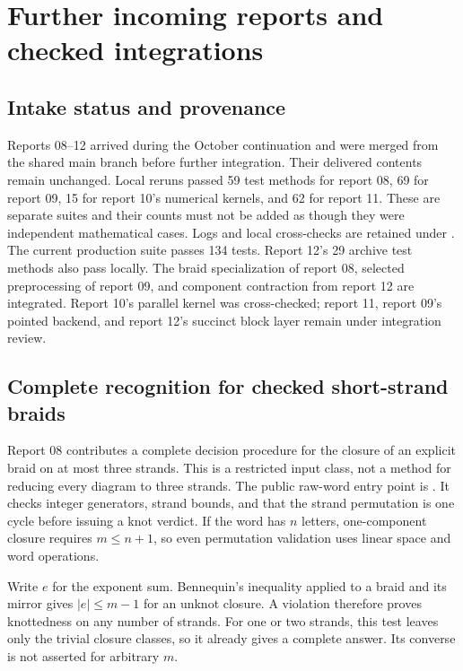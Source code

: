 \section{Further incoming reports and checked integrations}
\label{sec:incoming}

\subsection{Intake status and provenance}
Reports 08--12 arrived during the October continuation and were merged
from the shared main branch before further integration. Their delivered
contents remain unchanged. Local reruns passed 59 test methods for report
08, 69 for report 09, 15 for report 10's numerical kernels, and 62 for
report 11. These are separate suites and their counts must not be added
as though they were independent mathematical cases. Logs and local
cross-checks are retained under . The current
production suite passes 134 tests. Report 12's 29 archive test methods also
pass locally. The braid specialization of report 08, selected preprocessing
of report 09, and component contraction from report 12 are integrated.
Report 10's parallel kernel was cross-checked; report 11, report 09's pointed
backend, and report 12's succinct block layer remain under integration review.

\subsection{Complete recognition for checked short-strand braids}
Report 08 contributes a complete decision procedure for the closure of
an explicit braid on at most three strands. This is a restricted input
class, not a method for reducing every diagram to three strands. The
public raw-word entry point is . It checks
integer generators, strand bounds, and that the strand permutation is
one cycle before issuing a knot verdict. If the word has $n$ letters,
one-component closure requires $m\le n+1$, so even permutation validation
uses linear space and word operations.

Write $e$ for the exponent sum. Bennequin's inequality applied to a
braid and its mirror gives $|e|\le m-1$ for an unknot closure. A violation
therefore proves knottedness on any number of strands. For one or two
strands, this test leaves only the trivial closure classes, so it already
gives a complete answer. Its converse is not asserted for arbitrary $m$.

